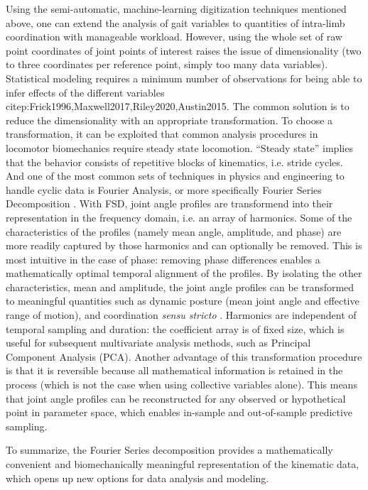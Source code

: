 \documentclass[10pt,a4paper]{article}
\begin{document}
Using the semi-automatic, machine-learning digitization techniques mentioned above, one can extend the analysis of gait variables to quantities of intra-limb coordination with manageable workload.
However, using the whole set of raw point coordinates of joint points of interest raises the issue of dimensionality (two to three coordinates per reference point, simply too many data variables).
Statistical modeling requires a minimum number of observations for being able to infer effects of the different variables citep:Frick1996,Maxwell2017,Riley2020,Austin2015.
The common solution is to reduce the dimensionality with an appropriate transformation.
To choose a transformation, it can be exploited that common analysis procedures in locomotor biomechanics require steady state locomotion.
``Steady state'' implies that the behavior consists of repetitive blocks of kinematics, i.e. stride cycles.
And one of the most common sets of techniques in physics and engineering to handle cyclic data is Fourier Analysis, or more specifically Fourier Series Decomposition \citep[FSD;][]{Mielke2019,Webb2007,Fourier1822,Bracewell2000,Gray1995,Pike2002}.
With FSD, joint angle profiles are transformend into their representation in the frequency domain, i.e. an array of harmonics.
Some of the characteristics of the profiles (namely mean angle, amplitude, and phase) are more readily captured by those harmonics and can optionally be removed.
This is most intuitive in the case of phase: removing phase differences enables a mathematically optimal temporal alignment of the profiles.
By isolating the other characteristics, mean and amplitude, the joint angle profiles can be transformed to meaningful quantities such as dynamic posture (mean joint angle and effective range of motion), and coordination \emph{sensu stricto} \citep[relative phase/joint timing and residual kinematics, \textit{cf.}][]{Mielke2019}.
Harmonics are independent of temporal sampling and duration: the coefficient array is of fixed size, which is useful for subsequent multivariate analysis methods, such as Principal Component Analysis (PCA).
Another advantage of this transformation procedure is that it is reversible because all mathematical information is retained in the process (which is not the case when using collective variables alone).
This means that joint angle profiles can be reconstructed for any observed or hypothetical point in parameter space, which enables in-sample and out-of-sample predictive sampling.

To summarize, the Fourier Series decomposition provides a mathematically convenient and biomechanically meaningful representation of the kinematic data, which opens up new options for data analysis and modeling.
\end{document}

